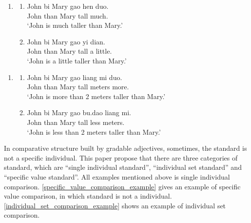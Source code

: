 \documentclass{ctexart}
\begin{document}
\begin{enumerate}
    \item
    \begin{enumerate}
        \item \label{dp_big_vague_example}
        John \enspace bi \enspace Mary \enspace gao \enspace hen duo.\\
        John than Mary \enspace tall \enspace \enspace much. \\
        `John is much taller than Mary.'

        \item \label{dp_small_vague_example}
        John \enspace bi \enspace Mary \enspace gao \enspace yi dian.\\
        John than Mary \enspace tall \enspace a little.\\
        `John is a little taller than Mary.'

    \end{enumerate}
\end{enumerate}

\begin{enumerate}
    \item
    \begin{enumerate}
        \item \label{dp_value_big_vague_example}
        John \enspace bi \enspace Mary \enspace gao \enspace liang mi \enspace \enspace duo.\\
        John than Mary \enspace tall  meters \enspace more. \\
        `John is more than 2 meters taller than Mary.'

        \item \label{dp_value_small_vague_example}
        John \enspace bi \enspace Mary \enspace gao \enspace bu.dao \enspace liang mi.\\
        John than Mary \enspace tall \enspace \enspace less \enspace \enspace {} meters. \\
        `John is less than 2 meters taller than Mary.'
    \end{enumerate}
\end{enumerate}

In comparative structure built by gradable adjectives, sometimes, the standard is not a specific individual. This paper propose that there are three categories of standard, which are ``single individual standard'', ``individual set standard'' and ``specific value standard''. All examples mentioned above is single individual comparison. \ref{specific_value_comparison_example} gives an example of specific value comparison, in which standard is not a individual. \ref{individual_set_comparison_example} shows an example of individual set comparison.
\end{document}
